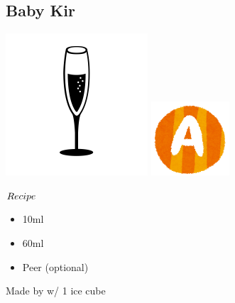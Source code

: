 \subsection{Baby Kir}
\vspace{-7.6mm}
\hspace{30mm}
\includegraphics[scale=.08]{cocktail_glass_flute.png}
\includegraphics[scale=.12]{capital_a.png}
\vspace{2.5mm}
\begin{itembox}[l]{\boldmath $Recipe$}
\begin{itemize}
\setlength{\parskip}{0cm}
\setlength{\itemsep}{0cm}
\item \cc 10ml
\item \gj 60ml
\item \lemon Peer (optional)
\end{itemize}
\vspace{-4mm}
Made by \build w/ 1 ice cube
\end{itembox}

